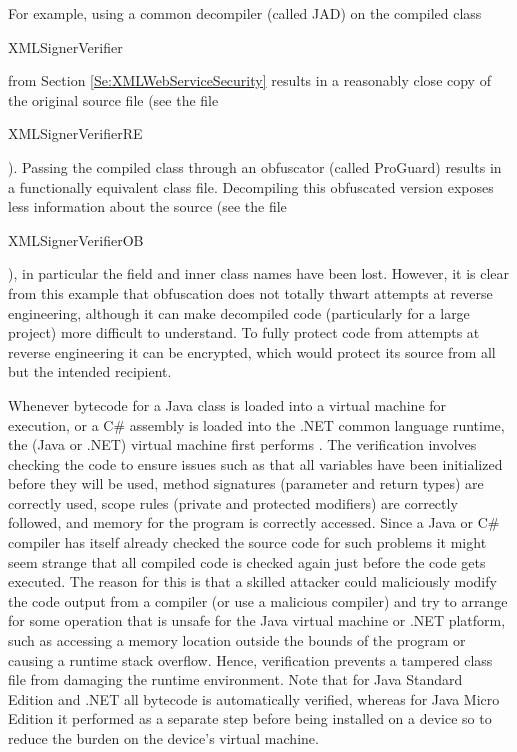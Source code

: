 For example, using a common decompiler (called JAD) on the compiled class
\begin{code}XMLSignerVerifier\end{code} from Section \ref{Se:XMLWebServiceSecurity}
results in a reasonably close copy of the original source file
(see the file \begin{code}XMLSignerVerifierRE\end{code}).
Passing the compiled class through an obfuscator (called ProGuard) results
in a functionally equivalent class file. Decompiling this
obfuscated version exposes less information about the source
(see the file \begin{code}XMLSignerVerifierOB\end{code}), in particular
the field and inner class names have been lost.
However, it is clear from this example that obfuscation does not totally thwart
attempts at reverse engineering,
although it can make decompiled code (particularly for a large project)
more difficult to understand. To fully protect
code from attempts at reverse engineering it can be encrypted,
which would protect its source from all but the intended recipient.

Whenever bytecode for a Java class is loaded into a virtual machine for
execution, or a C\# assembly is loaded into the .NET common language runtime,
the (Java or .NET) virtual machine first performs .
The verification involves checking the code to ensure issues
such as that all variables have been initialized before they will be used,
method signatures (parameter and return types) are correctly used,
scope rules (private and protected modifiers) are correctly followed,
and memory for the program is correctly accessed.
Since a Java or C\# compiler has itself already checked the source code for such problems
it might seem strange that all compiled code is checked again just before the code gets executed.
The reason for this is that a skilled attacker could maliciously modify the code output
from a compiler (or use a malicious compiler)
and try to arrange for some operation that is unsafe for the Java virtual machine or .NET platform,
such as accessing a memory location outside the bounds of the program or causing
a runtime stack overflow.
Hence, verification prevents a tampered class file from damaging the runtime environment.
Note that for Java Standard Edition and .NET all bytecode is automatically verified,
whereas for Java Micro Edition it performed as a separate step before being installed on
a device so to reduce the burden on the device's virtual machine.


